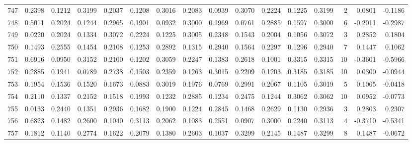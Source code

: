 \begin{tabular}{lrrrrrrrrrrrrrrr}
747 &      0.2398 &  0.1212 &  0.3199 &  0.2037 &  0.1208 &  0.3016 &  0.2083 &  0.0939 &  0.3070 &  0.2224 &   0.1225 &     0.3199 &      2 &                    0.0801 &                    -0.1186 \\
748 &      0.5011 &  0.2024 &  0.1244 &  0.2965 &  0.1901 &  0.0932 &  0.3000 &  0.1969 &  0.0761 &  0.2885 &   0.1597 &     0.3000 &      6 &                   -0.2011 &                    -0.2987 \\
749 &      0.0220 &  0.2024 &  0.1334 &  0.3072 &  0.2224 &  0.1225 &  0.3005 &  0.2348 &  0.1543 &  0.2004 &   0.1056 &     0.3072 &      3 &                    0.2852 &                     0.1804 \\
750 &      0.1493 &  0.2555 &  0.1454 &  0.2108 &  0.1253 &  0.2892 &  0.1315 &  0.2940 &  0.1564 &  0.2297 &   0.1296 &     0.2940 &      7 &                    0.1447 &                     0.1062 \\
751 &      0.6916 &  0.0950 &  0.3152 &  0.2100 &  0.1202 &  0.3059 &  0.2247 &  0.1383 &  0.2618 &  0.1001 &   0.3315 &     0.3315 &     10 &                   -0.3601 &                    -0.5966 \\
752 &      0.2885 &  0.1941 &  0.0789 &  0.2738 &  0.1503 &  0.2359 &  0.1263 &  0.3015 &  0.2209 &  0.1203 &   0.3185 &     0.3185 &     10 &                    0.0300 &                    -0.0944 \\
753 &      0.1954 &  0.1536 &  0.1520 &  0.1673 &  0.0883 &  0.3019 &  0.1976 &  0.0769 &  0.2991 &  0.2067 &   0.1105 &     0.3019 &      5 &                    0.1065 &                    -0.0418 \\
754 &      0.2110 &  0.1337 &  0.2152 &  0.1518 &  0.1993 &  0.1232 &  0.2885 &  0.1234 &  0.2475 &  0.1244 &   0.3062 &     0.3062 &     10 &                    0.0952 &                    -0.0773 \\
755 &      0.0133 &  0.2440 &  0.1351 &  0.2936 &  0.1682 &  0.1900 &  0.1224 &  0.2845 &  0.1468 &  0.2629 &   0.1130 &     0.2936 &      3 &                    0.2803 &                     0.2307 \\
756 &      0.6823 &  0.1482 &  0.2600 &  0.1040 &  0.3113 &  0.2062 &  0.1083 &  0.2551 &  0.0907 &  0.3000 &   0.2240 &     0.3113 &      4 &                   -0.3710 &                    -0.5341 \\
757 &      0.1812 &  0.1140 &  0.2774 &  0.1622 &  0.2079 &  0.1380 &  0.2603 &  0.1037 &  0.3299 &  0.2145 &   0.1487 &     0.3299 &      8 &                    0.1487 &                    -0.0672 \\

\end{tabular}
